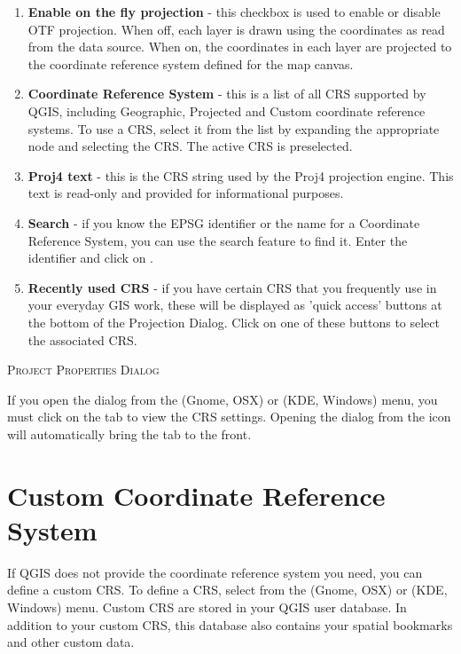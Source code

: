 \begin{enumerate}
\item \textbf{Enable on the fly projection} -
this checkbox is used to enable or disable OTF projection. When off, each
layer is drawn using the coordinates as read from the data source. When on,
the coordinates in each layer are projected to the coordinate reference
system defined for the map canvas.
\item \textbf{Coordinate Reference System} - this is a list of all CRS
supported by QGIS, including Geographic, Projected and Custom coordinate
reference systems. To use a CRS, select it from the list by expanding
the appropriate node and selecting the CRS. The active CRS is preselected.
\item \textbf{Proj4 text} - this is the CRS string used by the Proj4
projection engine. This text is read-only and provided for informational
purposes.
\item \textbf{Search} - if you know the EPSG identifier or the name 
for a Coordinate Reference System, you can use the search feature to find it.
Enter the identifier and click on .
\item \textbf{Recently used CRS} - if you have certain CRS that you frequently 
use in your everyday GIS work, these will be displayed as 'quick access' buttons 
at the bottom of the Projection Dialog. Click on one of these buttons to select 
the associated CRS.
\end{enumerate}

\begin{Tip}
\caption{\textsc{Project Properties Dialog}}
If you open the  dialog from the
 (Gnome, OSX) or  
(KDE, Windows) menu, you must click on the  tab to view the CRS settings. Opening the dialog from the
 icon will automatically bring
the  tab to the front.
\end{Tip}

\section{Custom Coordinate Reference System}\label{sec:customprojections}

If QGIS does not provide the coordinate reference system you need, you
can define a custom CRS. To define a CRS, select
 from the  
(Gnome, OSX) or  (KDE, Windows) menu.
Custom CRS are stored in your QGIS user database. In addition to your custom
CRS, this database also contains your spatial bookmarks and other custom data. 


